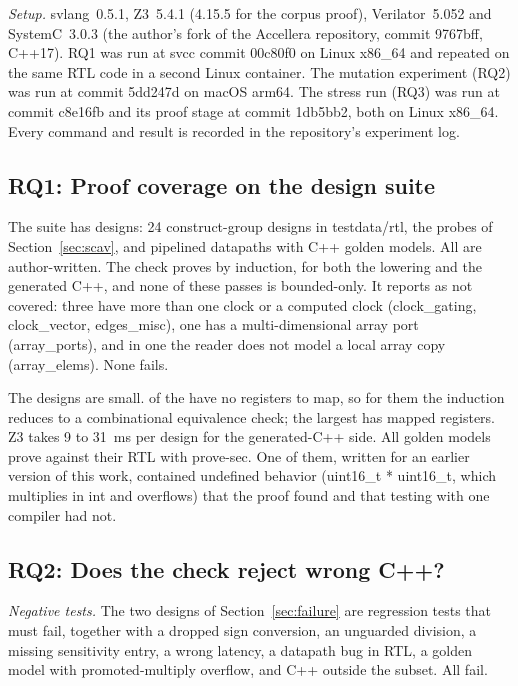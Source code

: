 \documentclass{ieeeaccess}
\newcommand{\code}[1]{{\fontshape{n}\ttfamily #1}}
\begin{document}
\emph{Setup.} \code{svlang}~0.5.1, Z3~5.4.1 (4.15.5 for the corpus proof), Verilator~5.052 and SystemC~3.0.3 (the author's fork of the Accellera
repository, commit \code{9767bff}, C++17). RQ1 was run at \code{svcc} commit \code{00c80f0} on Linux x86\_64
and repeated on the same RTL code in a second Linux container. The mutation experiment (RQ2) was
run at commit \code{5dd247d} on macOS arm64. The stress run (RQ3) was run at commit \code{c8e16fb} and
its proof stage at commit \code{1db5bb2}, both on Linux x86\_64. Every command and result is recorded in the repository's experiment log.

\subsection{RQ1: Proof coverage on the design suite}

The suite has \nDesigns{} designs: 24 construct-group designs in \code{testdata/rtl}, the
\nProbes{} probes of Section~\ref{sec:scav}, and \nCorpusRtl{} pipelined datapaths with C++ golden
models. All are author-written. The check proves \nProved{} by induction, for both the lowering
and the generated C++, and none of these passes is bounded-only. It reports \nNotCovered{} as not
covered: three have more than one clock or a computed clock (\code{clock\_gating},
\code{clock\_vector}, \code{edges\_misc}), one has a multi-dimensional array port
(\code{array\_ports}), and in one the reader does not model a local array copy
(\code{array\_elems}). None fails.

The designs are small. \nCombinational{} of the \nProved{} have no registers to map, so for them
the induction reduces to a combinational equivalence check; the largest has \nMaxPaired{} mapped
registers. Z3 takes 9 to 31~ms per design for the generated-C++ side. All \nGolden{} golden models
prove against their RTL with \code{prove-sec}. One of them, written for an earlier version of this
work, contained undefined behavior (\code{uint16\_t * uint16\_t}, which multiplies in \code{int} and
overflows) that the proof found and that testing with one compiler had not.

\subsection{RQ2: Does the check reject wrong C++?}
\label{sec:mutation}

\emph{Negative tests.} The two designs of Section~\ref{sec:failure} are regression tests that must
fail, together with a dropped sign conversion, an unguarded division, a missing sensitivity entry,
a wrong latency, a datapath bug in RTL, a golden model with promoted-multiply overflow, and C++
outside the subset. All fail.
\end{document}
